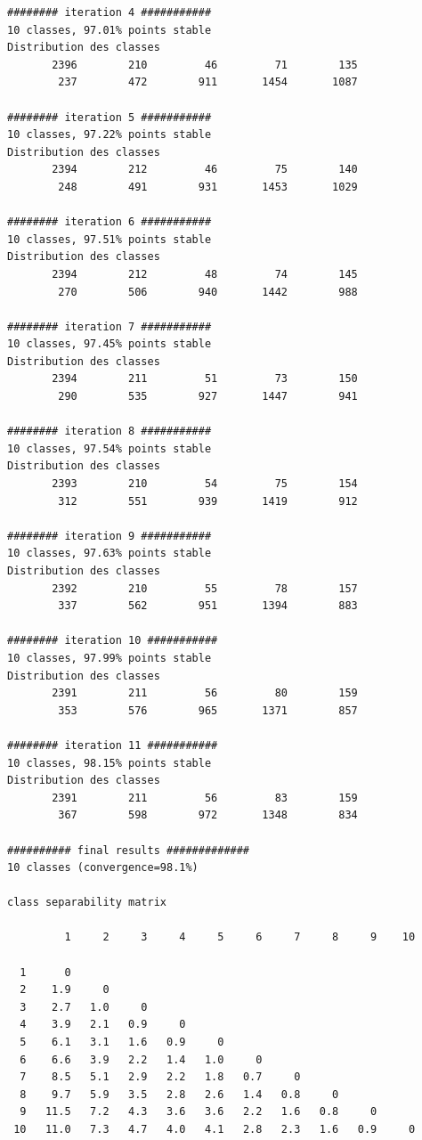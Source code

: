 \documentclass[earth,article,submit,pdftex,moreauthors]{Definitions/mdpi}
\begin{document}
{\begin{scriptsize}
\begin{verbatim}
######## iteration 4 ###########
10 classes, 97.01% points stable
Distribution des classes
       2396        210         46         71        135
        237        472        911       1454       1087

######## iteration 5 ###########
10 classes, 97.22% points stable
Distribution des classes
       2394        212         46         75        140
        248        491        931       1453       1029

######## iteration 6 ###########
10 classes, 97.51% points stable
Distribution des classes
       2394        212         48         74        145
        270        506        940       1442        988

######## iteration 7 ###########
10 classes, 97.45% points stable
Distribution des classes
       2394        211         51         73        150
        290        535        927       1447        941

######## iteration 8 ###########
10 classes, 97.54% points stable
Distribution des classes
       2393        210         54         75        154
        312        551        939       1419        912

######## iteration 9 ###########
10 classes, 97.63% points stable
Distribution des classes
       2392        210         55         78        157
        337        562        951       1394        883

######## iteration 10 ###########
10 classes, 97.99% points stable
Distribution des classes
       2391        211         56         80        159
        353        576        965       1371        857

######## iteration 11 ###########
10 classes, 98.15% points stable
Distribution des classes
       2391        211         56         83        159
        367        598        972       1348        834

########## final results #############
10 classes (convergence=98.1%)

class separability matrix

         1     2     3     4     5     6     7     8     9    10

  1      0
  2    1.9     0
  3    2.7   1.0     0
  4    3.9   2.1   0.9     0
  5    6.1   3.1   1.6   0.9     0
  6    6.6   3.9   2.2   1.4   1.0     0
  7    8.5   5.1   2.9   2.2   1.8   0.7     0
  8    9.7   5.9   3.5   2.8   2.6   1.4   0.8     0
  9   11.5   7.2   4.3   3.6   3.6   2.2   1.6   0.8     0
 10   11.0   7.3   4.7   4.0   4.1   2.8   2.3   1.6   0.9     0


\end{verbatim}
\end{scriptsize}}
\end{document}
